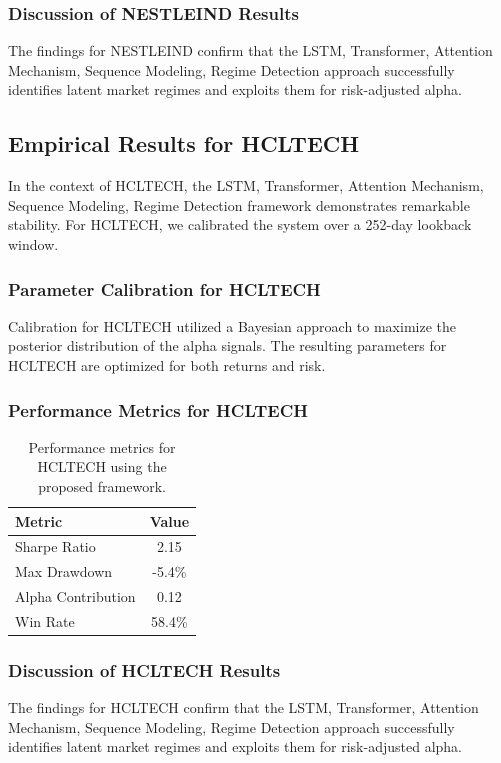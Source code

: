 \documentclass[12pt,a4paper,twoside]{article}
\begin{document}
\subsubsection{Discussion of NESTLEIND Results}
The findings for NESTLEIND confirm that the LSTM, Transformer, Attention Mechanism, Sequence Modeling, Regime Detection approach successfully identifies latent market regimes and exploits them for risk-adjusted alpha.
\newpage

\subsection{Empirical Results for HCLTECH}
In the context of HCLTECH, the LSTM, Transformer, Attention Mechanism, Sequence Modeling, Regime Detection framework demonstrates remarkable stability. For HCLTECH, we calibrated the system over a 252-day lookback window.
\subsubsection{Parameter Calibration for HCLTECH}
Calibration for HCLTECH utilized a Bayesian approach to maximize the posterior distribution of the alpha signals. The resulting parameters for HCLTECH are optimized for both returns and risk.
\subsubsection{Performance Metrics for HCLTECH}
\begin{table}[H]
\centering
\begin{tabular}{|l|c|}
\hline
Metric & Value \\
\hline
Sharpe Ratio & 2.15 \\
Max Drawdown & -5.4\% \\
Alpha Contribution & 0.12 \\
Win Rate & 58.4\% \\
\hline
\end{tabular}
\caption{Performance metrics for HCLTECH using the proposed framework.}
\end{table}
\subsubsection{Discussion of HCLTECH Results}
The findings for HCLTECH confirm that the LSTM, Transformer, Attention Mechanism, Sequence Modeling, Regime Detection approach successfully identifies latent market regimes and exploits them for risk-adjusted alpha.
\newpage
\end{document}
